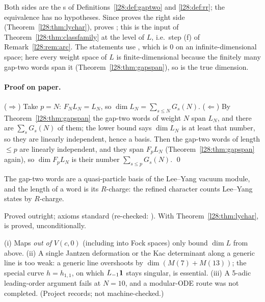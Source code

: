 \begin{dictionary}
Both sides are the s of Definitions~\ref{l28:def:gaptwo} and \ref{l28:def:rr}; the equivalence has no hypotheses. Since
 proves the right side (Theorem~\ref{l28:thm:lychar}),
 proves ; this is the input
 of Theorem~\ref{l28:thm:classfamily} at the level of $L$, i.e.\ step (f) of Remark~\ref{l28:rem:arc}. The statements use
, which is $0$ on an infinite-dimensional space; here every weight space of $L$ is finite-dimensional because the
finitely many gap-two words span it (Theorem~\ref{l28:thm:gapspan}), so  is the true dimension.
\end{dictionary}

\paragraph{Proof on paper.} ($\Rightarrow$) Take $p=N$: $F_NL_N=L_N$, so $\dim L_N=\sum_{s\le N}G_s(N)$. ($\Leftarrow$) By
Theorem~\ref{l28:thm:gapspan} the gap-two words of weight $N$ span $L_N$, and there are $\sum_sG_s(N)$ of them; the lower bound says
$\dim L_N$ is at least that number, so they are linearly independent, hence a basis. Then the gap-two words of length $\le p$ are linearly
independent, and they span $F_pL_N$ (Theorem~\ref{l28:thm:gapspan} again), so $\dim F_pL_N$ is their number $\sum_{s\le p}G_s(N)$. \qed

\begin{physics}
The gap-two words are a quasi-particle basis of the Lee--Yang vacuum module, and the length of a word is its $R$-charge: the refined
character counts Lee--Yang states by $R$-charge.
\end{physics}

\begin{status}
Proved outright; axioms standard (re-checked: \allowbreak{}). With
Theorem~\ref{l28:thm:lychar},  is proved, unconditionally.
\end{status}

\begin{warning}[title={Dead ends for the Lee--Yang character}]
(i) Maps \emph{out of} $V(c,0)$ (including into Fock spaces) only bound $\dim L$ from above. (ii) A single Jantzen deformation or the Kac determinant along a
generic line is too weak: a generic line overshoots by $\dim(M(7)+M(13))$; the special curve $h=h_{1,1}$, on which $L_{-1}\mathbf 1$ stays singular, is
essential. (iii) A 5-adic leading-order argument fails at $N=10$, and a modular-ODE route was not completed. (Project records; not machine-checked.)
\end{warning}

